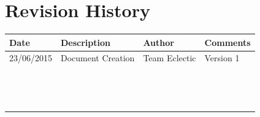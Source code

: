 \documentclass[11pt]{article}
\begin{document}


\setcounter{tocdepth}{3}
\setcounter{secnumdepth}{5}
\tableofcontents

\newpage
\section{Revision History}
\begin{table}[h]
\begin{tabular}{llll}
\textbf{Date}          & \textbf{Description}  & \textbf{Author}       & \textbf{Comments}   \\ \hline
\multicolumn{1}{|R{2cm}|}{23/06/2015} & \multicolumn{1}{L{4.5cm}|}{Document Creation} & \multicolumn{1}{l|}{Team Eclectic} & \multicolumn{1}{L{4cm}|}{Version 1} \\ \hline
\multicolumn{1}{|l|}{} & \multicolumn{1}{l|}{} & \multicolumn{1}{l|}{} & \multicolumn{1}{l|}{} \\ \hline
\multicolumn{1}{|l|}{} & \multicolumn{1}{l|}{} & \multicolumn{1}{l|}{} & \multicolumn{1}{l|}{} \\ \hline
\multicolumn{1}{|l|}{} & \multicolumn{1}{l|}{} & \multicolumn{1}{l|}{} & \multicolumn{1}{l|}{} \\ \hline
\multicolumn{1}{|l|}{} & \multicolumn{1}{l|}{} & \multicolumn{1}{l|}{} & \multicolumn{1}{l|}{} \\ \hline
\multicolumn{1}{|l|}{} & \multicolumn{1}{l|}{} & \multicolumn{1}{l|}{} & \multicolumn{1}{l|}{} \\ \hline
\multicolumn{1}{|l|}{} & \multicolumn{1}{l|}{} & \multicolumn{1}{l|}{} & \multicolumn{1}{l|}{} \\ \hline
\multicolumn{1}{|l|}{} & \multicolumn{1}{l|}{} & \multicolumn{1}{l|}{} & \multicolumn{1}{l|}{} \\ \hline
\multicolumn{1}{|l|}{} & \multicolumn{1}{l|}{} & \multicolumn{1}{l|}{} & \multicolumn{1}{l|}{} \\ \hline
\multicolumn{1}{|l|}{} & \multicolumn{1}{l|}{} & \multicolumn{1}{l|}{} & \multicolumn{1}{l|}{} \\ \hline
\multicolumn{1}{|l|}{} & \multicolumn{1}{l|}{} & \multicolumn{1}{l|}{} & \multicolumn{1}{l|}{} \\ \hline
\multicolumn{1}{|l|}{} & \multicolumn{1}{l|}{} & \multicolumn{1}{l|}{} & \multicolumn{1}{l|}{} \\ \hline
\multicolumn{1}{|l|}{} & \multicolumn{1}{l|}{} & \multicolumn{1}{l|}{} & \multicolumn{1}{l|}{} \\ \hline
\multicolumn{1}{|l|}{} & \multicolumn{1}{l|}{} & \multicolumn{1}{l|}{} & \multicolumn{1}{l|}{} \\ \hline
\multicolumn{1}{|l|}{} & \multicolumn{1}{l|}{} & \multicolumn{1}{l|}{} & \multicolumn{1}{l|}{} \\ \hline
\end{tabular}
\end{table}
\end{document}
